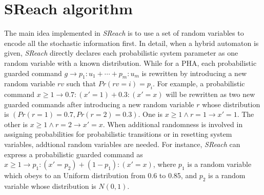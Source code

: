 \section{SReach algorithm}
The main idea implemented in {\it SReach} is to use a set of random variables to encode all the stochastic information first. In detail, when a hybrid automaton is given, {\it SReach} directly declares each probabilistic system parameter as one random variable with a known distribution. While for a PHA, each probabilistic guarded command $g \rightarrow p_1:u_1 + \cdots + p_m:u_m$ is rewritten by introducing a new random variable $rv$ such that $Pr(rv = i) = p_i$. For example, a probabilistic command $x \geq 1 \to 0.7 : (x' = 1)+ 0.3 :( x' = x)$ will be rewritten as two new guarded commands after introducing a new random variable $r$ whose distribution is $(Pr(r=1)=0.7, Pr(r=2)=0.3)$. One is $x \geq 1 \wedge r = 1 \to x'=1$. The other is $x \geq 1 \wedge r = 2 \to x'=x$. When additional randomness is involved in assigning probabilities for probabilistic transitions or in resetting system variables, addtional random variables are needed. For instance, {\it SReach} can express a probabilistic guarded command as $x \geq 1 \to p_1 : (x' = p_2 )+ (1-p_1) :( x' = x)$, where $p_1$ is a random variable which obeys to an Uniform distribution from 0.6 to 0.85, and $p_2$ is a random variable whose distribution is $N(0,1)$.

